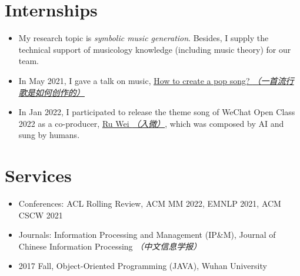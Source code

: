 \documentclass{resume}
\begin{document}
\section{Internships}
{\small {}
}
\begin{itemize}
  \item My research topic is \textit{symbolic music generation}. Besides, I supply the technical support of musicology knowledge (including music theory) for our team. 
  \item In May 2021, I gave a talk on music, \href{https://www.zhangxueyao.com/data/wcpr-pop-music.pdf}{\underline{How to create a pop song? \textit{（一首流行歌是如何创作的）}}}
  \item In Jan 2022, I participated to release the theme song of WeChat Open Class 2022 as a co-producer, \href{https://y.qq.com/n/ryqq/songDetail/000xeNJ53orPG2}{Ru Wei \textit{（入微）}}, which was composed by AI and sung by humans.
\end{itemize}

\section{Services}
\begin{itemize}
  \item Conferences: ACL Rolling Review, ACM MM 2022, EMNLP 2021, ACM CSCW 2021
  \item Journals: Information Processing and Management (IP\&M), Journal of Chinese Information Processing \textit{（中文信息学报）}
\end{itemize}
\begin{itemize}
  \item 2017 Fall, Object-Oriented Programming (JAVA), Wuhan University
\end{itemize}
\end{document}
